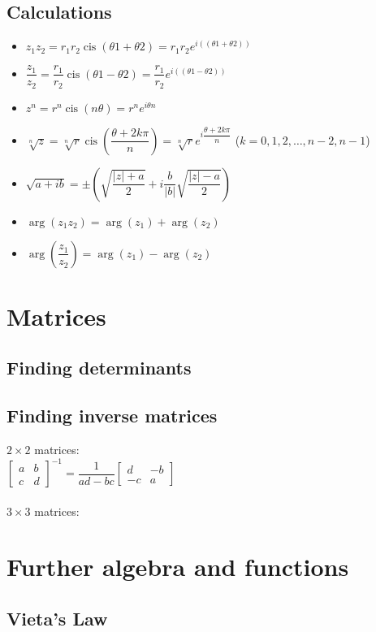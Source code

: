 \documentclass[A4paper]{article}
\DeclareMathOperator\cis{cis}
\begin{document}
	\subsection{Calculations}
	\begin{itemize}
		\item $z_1z_2=r_1r_2\cis(\theta1+\theta2)=r_1r_2e^{i((\theta1+\theta2))}$
		\item $\dfrac{z_1}{z_2}=\dfrac{r_1}{r_2}\cis(\theta1-\theta2)=\dfrac{r_1}{r_2}e^{i((\theta1-\theta2))}$
		\item $z^n = r^n\cis(n\theta)=r^ne^{i\theta n}$
		\item $\sqrt[n]{z}=\sqrt[n]{r}\cis(\dfrac{\theta+2k\pi}{n})=\sqrt[n]{r}e^{i\dfrac{\theta+2k\pi}{n}}$ ($k=0,1,2,\dots,n-2,n-1$)
		\item $\sqrt{a+ib}=\pm(\sqrt{\dfrac{|z|+a}{2}}+i\dfrac{b}{|b|}\sqrt{\dfrac{|z|-a}{2}})$
		\item $\arg(z_1z_2)=\arg(z_1)+\arg(z_2)$
		\item $\arg(\dfrac{z_1}{z_2})=\arg(z_1)-\arg(z_2)$
	\end{itemize}
	\pagebreak

	\section{Matrices}
	\subsection{Finding determinants}
	\subsection{Finding inverse matrices}
	$2\times2$ matrices:\\
	$\begin{bmatrix}
		a & b\\c & d
	\end{bmatrix}^{-1}=\dfrac{1}{ad-bc}\begin{bmatrix}
	d & -b\\-c & a
	\end{bmatrix}$ \\ \\
	$3\times3$ matrices:

	\pagebreak
	\section{Further algebra and functions}
	\subsection{Vieta's Law}
\end{document}
